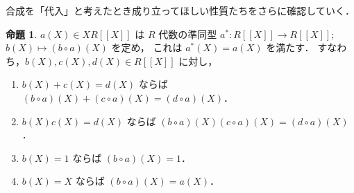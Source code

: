 \documentclass{jsarticle}
\newcommand{\longto}{\longrightarrow}
\theoremstyle{definition}
\newtheorem{Prp}{命題}
\newenvironment{prp}{\vspace{1ex}\begin{screen}\begin{Prp}}{\end{Prp}\end{screen}}
\begin{document}
合成を「代入」と考えたとき成り立ってほしい性質たちをさらに確認していく．

\begin{prp}
  \label{prp:composition-hom}
  $a(X) \in X R[[X]]$ は $R$ 代数の準同型 $a^*\colon R[[X]] \longto R[[X]]$; $b(X) \longmapsto (b \circ a)(X)$ を定め，
  これは $a^*(X) = a(X)$ を満たす．
  すなわち，$b(X), c(X), d(X) \in R[[X]]$ に対し，
  \begin{enumerate}[(1)]
    \item $b(X) + c(X) = d(X)$ ならば $(b \circ a)(X) + (c \circ a)(X) = (d \circ a)(X)$．
    \item $b(X) c(X) = d(X)$ ならば $(b \circ a)(X) (c \circ a)(X) = (d \circ a)(X)$．
    \item $b(X) = 1$ ならば $(b \circ a)(X) = 1$．
    \item $b(X) = X$ ならば $(b \circ a)(X) = a(X)$．
  \end{enumerate}
\end{prp}
\end{document}
